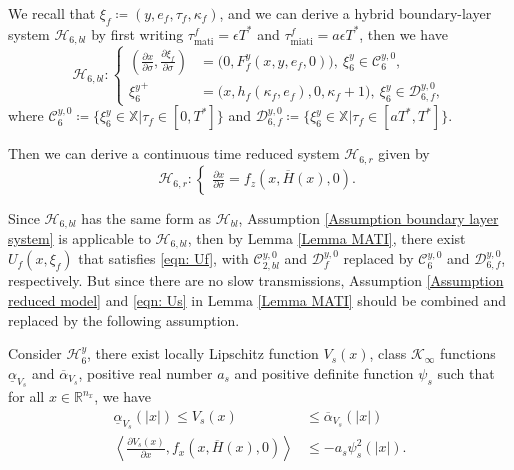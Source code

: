 We recall that $\xi_f\coloneqq (y,e_f, \tau_f, \kappa_f)$, and we can derive a hybrid boundary-layer system $\mathcal{H}_{6,bl}$ by first writing $\tau_{\text{mati}}^f =  \epsilon T^*$ and $\tau_{\text{miati}}^f = a \epsilon T^*$, then we have
\begin{equation*}
    \mathcal{H}_{6,bl}:\left\{
\begin{aligned}
    (\tfrac{\partial x}{\partial \sigma}, \tfrac{\partial \xi_f}{\partial \sigma}) &= \big(0, F_f^y(x,y,e_f,0) \big),\ \xi_6^y \in \mathcal{C}_6^{y,0}, \\
    {\xi_6^y}^+ &= \big(x,h_f(\kappa_f, e_f), 0, \kappa_f + 1\big), \ \xi_6^y\in \mathcal{D}_{6,f}^{y,0},
\end{aligned}
    \right.    
\end{equation*}
where $\mathcal{C}_6^{y,0}\coloneqq \{\xi_6^y \in \mathbb{X} | \tau_f \in [0, T^*] \}$ and $\mathcal{D}_{6,f}^{y,0} \coloneqq \{\xi_6^y \in \mathbb{X} | \tau_f \in [aT^*, T^*] \}$.


Then we can derive a continuous time reduced system $\mathcal{H}_{6,r}$ given by 
\begin{equation*}
    \mathcal{H}_{6,r} : \begin{cases}
        \tfrac{\partial x}{\partial \sigma} = f_z(x,\overline{H}(x),0).
    \end{cases}
\end{equation*}



Since $\mathcal{H}_{6,bl}$ has the same form as $\mathcal{H}_{bl}$, Assumption \ref{Assumption boundary layer system} is applicable to $\mathcal{H}_{6,bl}$, then by Lemma \ref{Lemma MATI}, there exist $U_f(x, \xi_f)$ that satisfies \eqref{eqn: Uf}, with $\mathcal{C}_{2,bl}^{y,0}$ and $\mathcal{D}_f^{y,0}$ replaced by $\mathcal{C}_6^{y,0}$ and $\mathcal{D}_{6,f}^{y,0}$, respectively. But since there are no slow transmissions, Assumption \ref{Assumption reduced model} and \eqref{eqn: Us} in Lemma \ref{Lemma MATI} should be combined and replaced by the following assumption.
\begin{assum}
    Consider $\mathcal{H}_6^y$, there exist locally Lipschitz function $V_s(x)$, class $\mathcal{K}_\infty$ functions $\underline{\alpha}_{V_s}$ and $\overline{\alpha}_{V_s}$, positive real number $a_s$ and positive definite function $\psi_s$ such that for all $x \in \mathbb{R}^{n_x}$, we have
    \begin{align}
    \underline{\alpha}_{V_s}\left(\left| x \right|\right)\leq {V_s}(x) & \leq \overline{\alpha}_{V_s}\left(\left| x\right|\right) \\
     \left< \tfrac{\partial {V_s}(x)}{\partial x},f_x(x,\overline{H}(x),0)  \right> &\leq -a_s \psi_s^2 \left(| x |\right).
     \label{eqn: Assumption stable slow subsystem, Us flow}
    \end{align}
    \label{Assumption Stable slow subsystem}
\end{assum}

